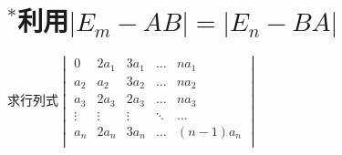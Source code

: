 \section{$^*$利用$|E_m-AB|=|E_n-BA|$}

\begin{example}
    求行列式$\begin{vmatrix}
        0&2a_1&3a_1&\ldots&na_1\\
        a_2&a_2&3a_2&\ldots&na_2\\
        a_3&2a_3&2a_3&\ldots&na_3\\
        \vdots&\vdots&\vdots&\ddots&\ldots\\
        a_n&2a_n&3a_n&\ldots&(n-1)a_n\\
        \end{vmatrix}$
\end{example}

